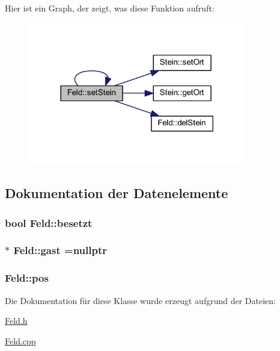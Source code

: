 Hier ist ein Graph, der zeigt, was diese Funktion aufruft\+:\nopagebreak
\begin{figure}[H]
\begin{center}
\leavevmode
\includegraphics[width=270pt]{class_feld_a00d3eec0ced82a8aee97de9b5f030df2_cgraph}
\end{center}
\end{figure}




\subsection{Dokumentation der Datenelemente}
\hypertarget{class_feld_aae4074e0032cce9eb0162394c639a4a0}{}
\subsubsection[{besetzt}]{\setlength{\rightskip}{0pt plus 5cm}bool Feld\+::besetzt\hspace{0.3cm}{\ttfamily [private]}}\label{class_feld_aae4074e0032cce9eb0162394c639a4a0}
\hypertarget{class_feld_a95773640265709ae8632d6a91655575d}{}
\subsubsection[{gast}]{$\ast$ Feld\+::gast =nullptr\hspace{0.3cm}{\ttfamily [private]}}\label{class_feld_a95773640265709ae8632d6a91655575d}
\hypertarget{class_feld_a1ac2c5d077b149682a32a238aec77991}{}
\subsubsection[{pos}]{ Feld\+::pos\hspace{0.3cm}{\ttfamily [private]}}\label{class_feld_a1ac2c5d077b149682a32a238aec77991}


Die Dokumentation für diese Klasse wurde erzeugt aufgrund der Dateien\+:\begin{DoxyCompactItemize}
\item 
\hyperlink{_feld_8h}{Feld.\+h}\item 
\hyperlink{_feld_8cpp}{Feld.\+cpp}\end{DoxyCompactItemize}
